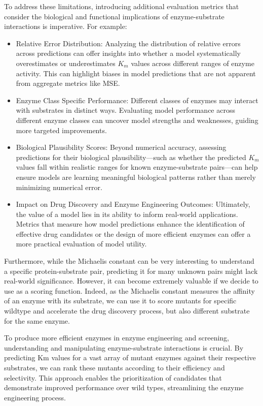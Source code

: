 To address these limitations, introducing additional evaluation metrics that consider the biological and functional implications of enzyme-substrate interactions is imperative. For example:
\begin{itemize}
    \item Relative Error Distribution: Analyzing the distribution of relative errors across predictions can offer insights into whether a model systematically overestimates or underestimates $K_m$ values across different ranges of enzyme activity. This can highlight biases in model predictions that are not apparent from aggregate metrics like MSE.
    \item Enzyme Class Specific Performance: Different classes of enzymes may interact with substrates in distinct ways. Evaluating model performance across different enzyme classes can uncover model strengths and weaknesses, guiding more targeted improvements.
    \item Biological Plausibility Scores: Beyond numerical accuracy, assessing predictions for their biological plausibility—such as whether the predicted $K_m$ values fall within realistic ranges for known enzyme-substrate pairs—can help ensure models are learning meaningful biological patterns rather than merely minimizing numerical error.
    \item Impact on Drug Discovery and Enzyme Engineering Outcomes: Ultimately, the value of a model lies in its ability to inform real-world applications. Metrics that measure how model predictions enhance the identification of effective drug candidates or the design of more efficient enzymes can offer a more practical evaluation of model utility.
\end{itemize}

Furthermore, while the Michaelis constant can be very interesting to understand a specific protein-substrate pair, predicting it for many unknown pairs might lack real-world significance. However, it can become extremely valuable if we decide to use as a scoring function. Indeed, as the Michaelis constant measures the affinity of an enzyme with its substrate, we can use it to score mutants for specific wildtype and accelerate the drug discovery process, but also different substrate for the same enzyme.

To produce more efficient enzymes in enzyme engineering and screening, understanding and manipulating enzyme-substrate interactions is crucial. By predicting Km values for a vast array of mutant enzymes against their respective substrates, we can rank these mutants according to their efficiency and selectivity. This approach enables the prioritization of candidates that demonstrate improved performance over wild types, streamlining the enzyme engineering process.

